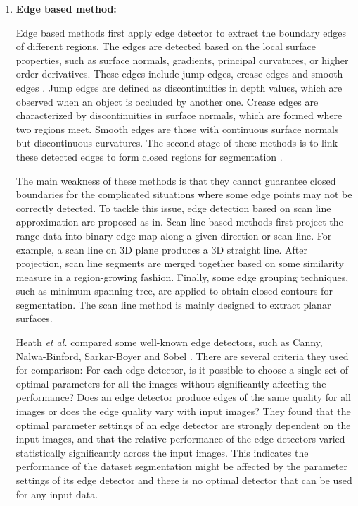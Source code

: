 \begin{enumerate}

\item {\bf Edge based method:}

Edge based methods first apply edge detector to
extract the boundary edges of different regions.
The edges are detected based on the local surface properties, 
such as surface normals, gradients, principal curvatures, 
or higher order derivatives.
These edges include jump edges, crease edges and smooth edges \cite{MS_JBU}.
Jump edges are defined as discontinuities in depth values, 
which are observed when an object is occluded by another one.
Crease edges are characterized by discontinuities in surface normals,
which are formed where two regions meet.
Smooth edges are those with continuous surface normals but 
discontinuous curvatures.
The second stage of these methods is to link these detected edges
to form closed regions for segmentation \cite{MS_SV,MS_KS}.

The main weakness of these methods is that 
they cannot guarantee closed boundaries 
for the complicated situations where some edge points 
may not be correctly detected.
To tackle this issue, edge detection based on
scan line approximation are proposed as in\cite{MS_SD,MS_KMK,MS_JB}.
Scan-line based methods first project the range data into 
binary edge map along a given direction or scan line. 
For example, a scan line on 3D plane produces a 3D straight line.
After projection, scan line segments are merged together
based on some similarity measure in a region-growing fashion.
Finally, some edge grouping techniques, such as 
minimum spanning tree, are applied to obtain closed contours
for segmentation.
The scan line method is mainly designed to extract planar surfaces.

Heath {\it et al.} compared some well-known edge detectors,
such as Canny, Nalwa-Binford, Sarkar-Boyer and Sobel \cite{MS_HSSB}.
There are several criteria they used for comparison:
For each edge detector, 
is it possible to choose a single set of optimal parameters 
for all the images without significantly affecting the performance?
Does an edge detector produce edges of the same quality for all images
or does the edge quality vary with input images?
They found that the optimal parameter settings of an edge detector
are strongly dependent on the input images,
and that the relative performance of the edge detectors varied 
statistically significantly across the input images.
This indicates the performance of the dataset segmentation
might be affected by the parameter settings of its edge detector
and there is no optimal detector that can be used for any input data.



\end{enumerate}
